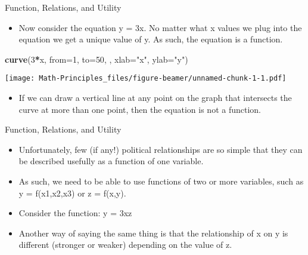\documentclass[
  ignorenonframetext,
]{beamer}
\newenvironment{Shaded}{\begin{snugshade}}{\end{snugshade}}
\newcommand{\DataTypeTok}[1]{\textcolor[rgb]{0.13,0.29,0.53}{#1}}
\newcommand{\DecValTok}[1]{\textcolor[rgb]{0.00,0.00,0.81}{#1}}
\newcommand{\KeywordTok}[1]{\textcolor[rgb]{0.13,0.29,0.53}{\textbf{#1}}}
\newcommand{\NormalTok}[1]{#1}
\newcommand{\OperatorTok}[1]{\textcolor[rgb]{0.81,0.36,0.00}{\textbf{#1}}}
\newcommand{\StringTok}[1]{\textcolor[rgb]{0.31,0.60,0.02}{#1}}
\providecommand{\tightlist}{%
  \setlength{\itemsep}{0pt}\setlength{\parskip}{0pt}}
\begin{document}
\begin{frame}[fragile]{Function, Relations, and Utility}
\protect\hypertarget{function-relations-and-utility-3}{}

\begin{itemize}
\tightlist
\item
  Now consider the equation y = 3x. No matter what x values we plug into
  the equation we get a unique value of y. As such, the equation is a
  function.
\end{itemize}

\begin{Shaded}
\begin{Highlighting}[]
\KeywordTok{curve}\NormalTok{(}\DecValTok{3}\OperatorTok{*}\NormalTok{x, }\DataTypeTok{from=}\DecValTok{1}\NormalTok{, }\DataTypeTok{to=}\DecValTok{50}\NormalTok{, , }\DataTypeTok{xlab=}\StringTok{"x"}\NormalTok{, }\DataTypeTok{ylab=}\StringTok{"y"}\NormalTok{)}
\end{Highlighting}
\end{Shaded}

\texttt{[image: Math-Principles\_files/figure-beamer/unnamed-chunk-1-1.pdf]}

\begin{itemize}
\tightlist
\item
  If we can draw a vertical line at any point on the graph that
  intersects the curve at more than one point, then the equation is not
  a function.
\end{itemize}

\end{frame}

\begin{frame}{Function, Relations, and Utility}
\protect\hypertarget{function-relations-and-utility-4}{}

\begin{itemize}
\item
  Unfortunately, few (if any!) political relationships are so simple
  that they can be described usefully as a function of one variable.
\item
  As such, we need to be able to use functions of two or more variables,
  such as y = f(x1,x2,x3) or z = f(x,y).
\item
  Consider the function: y = 3xz
\item
  Another way of saying the same thing is that the relationship of x on
  y is different (stronger or weaker) depending on the value of z.
\end{itemize}

\end{frame}
\end{document}
